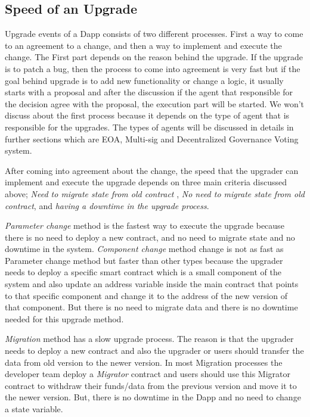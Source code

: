 \subsection{Speed of an Upgrade}
Upgrade events of a Dapp consists of two different processes. First a way to come to an agreement to a change, and then a way to implement and execute the change. The First part depends on the reason behind the upgrade. If the upgrade is to patch a bug, then the process to come into agreement is very fast but if the goal behind upgrade is to add new functionality or change a logic, it usually starts with a proposal and after the discussion if the agent that responsible for the decision agree with the proposal, the execution part will be started. We won't discuss about the first process because it depends on the type of agent that is responsible for the upgrades. The types of agents will be discussed in details in further sections which are EOA, Multi-sig and Decentralized Governance Voting system. 

After coming into agreement about the change, the speed that the upgrader can implement and execute the upgrade depends on three main criteria discussed above; \textit{Need to migrate state from old contract} , \textit{No need to migrate state from old contract}, and \textit{having a downtime in the upgrade process}.
 
\textit{Parameter change} method is the fastest way to execute the upgrade because there is no need to deploy a new contract, and no need to migrate state and no downtime in the system.
\textit{Component change} method change is not as fast as Parameter change method but faster than other types because the upgrader needs to deploy a specific smart contract which is a small component of the system and also update an address variable inside the main contract that points to that specific component and change it to the address of the new version of that component. But there is no need to migrate data and there is no downtime needed for this upgrade method.

\textit{Migration} method has a slow upgrade process. The reason is that the upgrader needs to deploy a new contract and also the upgrader or users should transfer the data from old version to the newer version. In most Migration processes the developer team deploy a \textit{Migrator} contract and users should use this Migrator contract to withdraw their funds/data from the previous version and move it to the newer version. But, there is no downtime in the Dapp and no need to change a state variable.

